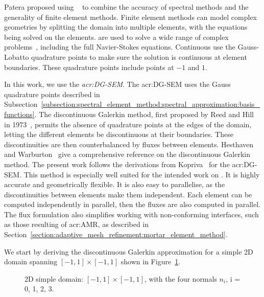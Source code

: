 Patera proposed using ~\cite{Patera1984} to combine the accuracy of spectral
methods and the generality of finite element methods. Finite element methods can model complex
geometries by splitting the domain into multiple elements, with the equations being solved on the
elements.  are used to solve a wide range of complex problems~\cite{Deville2003},
including the full Navier-Stokes equations. Continuous  use the Gauss-Lobatto
quadrature points to make sure the solution is continuous at element boundaries. These quadrature
points include points at \(-1\) and \(1\).

In this work, we use the \textit{\acrfull{acr:DG-SEM}}. The \acrshort{acr:DG-SEM} uses the Gauss
quadrature points described in
Subsection~\ref{subsection:spectral_element_method:spectral_approximation:basis_functions}. The
discontinuous Galerkin method, first proposed by Reed and Hill in 1973~\cite{Reed1973}, permits the
absence of quadrature points at the edges of the domain, letting the different elements be
discontinuous at their boundaries. These discontinuities are then counterbalanced by fluxes between
elements. Hesthaven and Warburton~\cite{Hesthaven2007} give a comprehensive reference on the
discontinuous Galerkin method. The present work follows the derivations from
Kopriva~\cite{Kopriva2009} for the \acrshort{acr:DG-SEM}. This method is especially well suited for
the intended work on . It is highly accurate and geometrically flexible. It is
also easy to parallelise, as the discontinuities between elements make them independent. Each
element can be computed independently in parallel, then the fluxes are also computed in parallel.
The flux formulation also simplifies working with non-conforming interfaces, such as those resulting
of \acrlong{acr:AMR}, as described in
Section~\ref{section:adaptive_mesh_refinement:mortar_element_method}.

We start by deriving the discontinuous Galerkin approximation for a simple 2D domain spanning
\(\left[ -1, 1 \right] \times \left[ -1, 1 \right]\) shown in Figure~\ref{fig:simple_domain}.

\begin{figure}[H]
    \centering
    
    \caption{2D simple domain: \(\left[ -1, 1 \right] \times \left[ -1, 1 \right]\), with the four normals \(n_i\), i = 0, 1, 2, 3.}\label{fig:simple_domain}
\end{figure}

